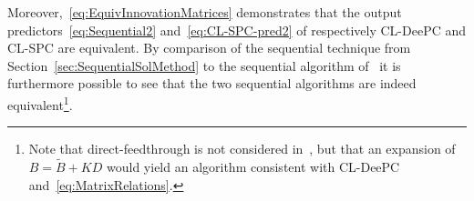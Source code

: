 Moreover,~\eqref{eq:EquivInnovationMatrices} demonstrates that the output predictors~\eqref{eq:Sequential2} and~\eqref{eq:CL-SPC-pred2} of respectively \ac{CL-DeePC} and \ac{CL-SPC} are equivalent. By comparison of the sequential technique from Section~\ref{sec:SequentialSolMethod} to the sequential algorithm of~\cite{Dong2008} it is furthermore possible to see that the two sequential algorithms are indeed equivalent\footnote{Note that direct-feedthrough is not considered in~\cite{Dong2008}, but that an expansion of $B=\tilde{B}+KD$ would yield an algorithm consistent with \ac{CL-DeePC} and~\eqref{eq:MatrixRelations}.}.


